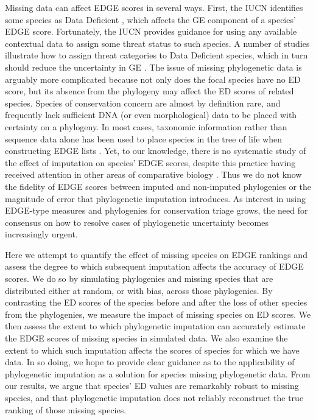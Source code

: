 \documentclass[10pt,english]{article}
\begin{document}
Missing data can affect EDGE scores in several ways. First, the IUCN identifies
some species as Data Deficient \autocite{Iucn2001, Iucn2008}, which affects the
GE component of a species' EDGE score. Fortunately, the IUCN provides guidance
for using any available contextual data to assign some threat status to such
species. A number of studies illustrate how to assign threat categories to Data
Deficient species, which in turn should reduce the uncertainty in GE
\autocite{Good2006, Butchart2010, Morais2013, Dulvy2014}. The issue of missing
phylogenetic data is arguably more complicated because not only does the focal
species have no ED score, but its absence from the phylogeny may affect the ED
scores of related species. Species of conservation concern are almost by
definition rare, and frequently lack sufficient DNA (or even morphological) data
to be placed with certainty on a phylogeny. In most cases, taxonomic information
rather than sequence data alone has been used to place species in the tree of
life when constructing EDGE lists \autocite[see][]{Isaac2007, Collen2011,
Isaac2012, Jetz2014, Curnick2015, Stein2018, Gumbs2018, Forest2018}. Yet, to our
knowledge, there is no systematic study of the effect of imputation on species’
EDGE scores, despite this practice having received attention in other areas of
comparative biology \autocite{Kuhn2011, Thomas2013, Rabosky2015}. Thus we do not
know the fidelity of EDGE scores between imputed and non-imputed phylogenies or
the magnitude of error that phylogenetic imputation introduces. As interest in
using EDGE-type measures and phylogenies for conservation triage grows, the need
for consensus on how to resolve cases of phylogenetic uncertainty becomes
increasingly urgent.

Here we attempt to quantify the effect of missing species on EDGE rankings and
assess the degree to which subsequent imputation affects the accuracy of EDGE
scores. We do so by simulating phylogenies and missing species that are
distributed either at random, or with bias, across those phylogenies. By
contrasting the ED scores of the species before and after the loss of other
species from the phylogenies, we measure the impact of missing species on ED
scores. We then assess the extent to which phylogenetic imputation can
accurately estimate the EDGE scores of missing species in simulated data. We
also examine the extent to which such imputation affects the scores of species
for which we have data. In so doing, we hope to provide clear guidance as to the
applicability of phylogenetic imputation as a solution for species missing
phylogenetic data. From our results, we argue that species’ ED values are
remarkably robust to missing species, and that phylogenetic imputation does not
reliably reconstruct the true ranking of those missing species.
\end{document}
